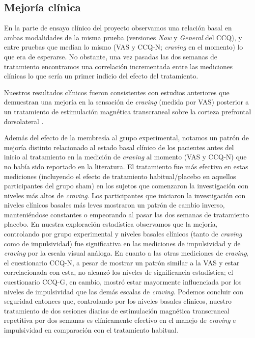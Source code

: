 \subsection{Mejoría clínica}
En la parte de ensayo clínico del proyecto observamos una relación basal en ambas modalidades de la misma prueba (versiones \textit{Now} y \textit{General} del CCQ), y entre pruebas que medían lo mismo (VAS y CCQ-N; \textit{craving} en el momento) lo que era de esperarse. No obstante, una vez pasadas las dos semanas de tratamiento encontramos una correlación incrementada entre las mediciones clínicas lo que sería un primer indicio del efecto del tratamiento. \par
Nuestros resultados clínicos fueron consistentes con estudios anteriores que demuestran una mejoría en la sensación de \textit{craving} (medida por VAS) posterior a un tratamiento de estimulación magnética transcraneal sobre la corteza prefrontal dorsolateral \parencite{Politi2008, Terraneo2016}. \par
Además del efecto de la membresía al grupo experimental, notamos un patrón de mejoría distinto relacionado al estado basal clínico de los pacientes antes del inicio al tratamiento en la medición de \textit{craving} al momento (VAS y CCQ-N) que no había sido reportado en la literatura.
El tratamiento fue más efectivo en estas mediciones (incluyendo el efecto de tratamiento habitual/placebo en aquellos participantes del grupo sham) en los sujetos que comenzaron la investigación con niveles más altos de \textit{craving}. Los participantes que iniciaron la investigación con niveles clínicos basales más leves mostraron un patrón de cambio inverso, manteniéndose constantes o empeorando al pasar las dos semanas de tratamiento placebo.
En nuestra exploración estadística observamos que la mejoría, controlando por grupo experimental y niveles basales clínicos (tanto de \textit{craving} como de impulsividad) fue significativa en las mediciones de impulsividad y de \textit{craving} por la escala visual análoga. En cuanto a las otras mediciones de \textit{craving}, el cuestionario  CCQ-N, a pesar de mostrar un patrón similar a la VAS y estar correlacionada con esta, no alcanzó los niveles de significancia estadística; el cuestionario CCQ-G, en cambio, mostró estar mayormente influenciada por los niveles de impulsividad que las demás escalas de \textit{craving}.
Podemos concluir con seguridad entonces que, controlando por los niveles basales clínicos, nuestro tratamiento de dos sesiones diarias de estimulación magnética transcraneal repetitiva por dos semanas es clínicamente efectivo en el manejo de \textit{craving} e impulsividad en comparación con el tratamiento habitual.

